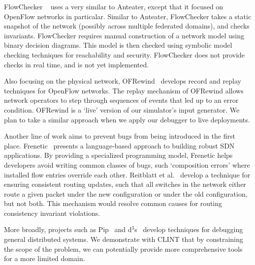 FlowChecker ~\cite{flowchecker} uses a very similar to Anteater, except that
it focused on OpenFlow networks in particalar.  Similar to Anteater, FlowChecker
takes a static snapshot of the network (possibly across multiple federated
domains), and checks invariants. FlowChecker requires manual construction of a
network model using binary decision diagrams. This model is then checked using symbolic model checking
techniques for reachability and security. FlowChecker does not provide checks in real
time, and is not yet implemented.

Also focusing on the physical network, OFRewind~\cite{ofrewind} develops record and replay techniques
for OpenFlow networks. The replay
mechanism of OFRewind allows network operators to step through sequences of
events that led up to an error condition. OFRewind is a `live' version of our
simulator's input generator. We plan to take a similar approach when we apply
our debugger to live deployments. 

Another line of work aims to prevent bugs from being introduced in the first
place. Frenetic~\cite{frenetic} presents a language-based approach to building
robust SDN applications. By providing a specialized programming model, Frenetic helps developers avoid writing common classes of
bugs, such `composition errors' where installed flow entries override each other.
Reitblatt et al.~\cite{consistentupdates} develop a technique for ensuring
consistent routing updates, such that all switches in the network either route
a given packet under the new configuration or under the old configuration,
but not both. This mechanism would resolve common causes for routing consistency 
invariant violations.

More broadly, projects such as Pip~\cite{pip} and d$^3$s~\cite{d3s} develop
techniques for debugging general distributed systems. 
We demonstrate with CLINT that by constraining the scope of the problem,
we can potentially provide more comprehensive tools for a more limited domain.






